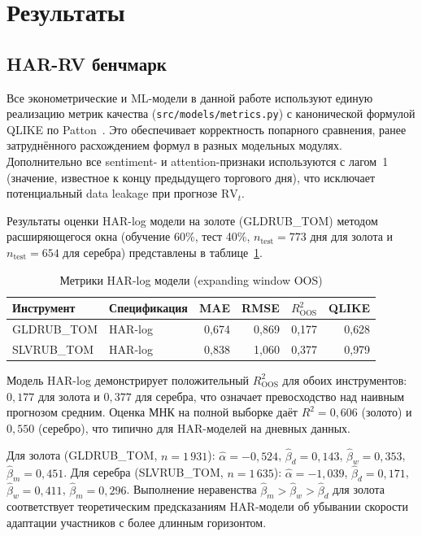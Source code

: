\section{Результаты}
\label{sec:results}

\subsection{HAR-RV бенчмарк}

Все эконометрические и ML-модели в данной работе используют единую
реализацию метрик качества (\texttt{src/models/metrics.py}) с канонической
формулой QLIKE по Patton~\cite{Patton2011}. Это обеспечивает корректность
попарного сравнения, ранее затруднённого расхождением формул в разных
модельных модулях.
Дополнительно все sentiment- и attention-признаки используются
с лагом~1 (значение, известное к концу предыдущего торгового дня),
что исключает потенциальный data leakage при прогнозе $\mathrm{RV}_t$.

Результаты оценки HAR-log модели на золоте (GLDRUB\_TOM) методом
расширяющегося окна (обучение 60\%, тест 40\%, $n_{\text{test}} = 773$
дня для золота и $n_{\text{test}} = 654$ для серебра) представлены
в таблице~\ref{tab:har_results}.

\begin{table}[h!]
\centering
\caption{Метрики HAR-log модели (expanding window OOS)}
\label{tab:har_results}
\begin{tabular}{llrrrr}
\hline
Инструмент & Спецификация & MAE & RMSE & $R^2_{\mathrm{OOS}}$ & QLIKE \\
\hline
GLDRUB\_TOM & HAR-log & 0{,}674 & 0{,}869 & 0{,}177 & 0{,}628 \\
SLVRUB\_TOM & HAR-log & 0{,}838 & 1{,}060 & 0{,}377 & 0{,}979 \\
\hline
\end{tabular}
\end{table}

Модель HAR-log демонстрирует положительный $R^2_{\mathrm{OOS}}$
для обоих инструментов: $0{,}177$ для золота и $0{,}377$ для серебра,
что означает превосходство над наивным прогнозом средним.
Оценка МНК на полной выборке даёт $R^2 = 0{,}606$ (золото) и $0{,}550$ (серебро),
что типично для HAR-моделей на дневных данных.

Для золота (GLDRUB\_TOM, $n=1\,931$):
$\hat\alpha=-0{,}524$, $\hat\beta_d = 0{,}143$, $\hat\beta_w = 0{,}353$, $\hat\beta_m = 0{,}451$.
Для серебра (SLVRUB\_TOM, $n=1\,635$):
$\hat\alpha=-1{,}039$, $\hat\beta_d = 0{,}171$, $\hat\beta_w = 0{,}411$, $\hat\beta_m = 0{,}296$.
Выполнение неравенства $\hat\beta_m > \hat\beta_w > \hat\beta_d$
для золота соответствует теоретическим предсказаниям HAR-модели
об убывании скорости адаптации участников с более длинным горизонтом.

